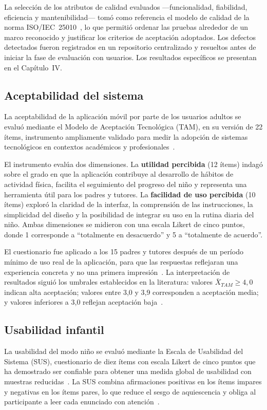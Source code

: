 				La selección de los atributos de calidad evaluados ---funcionalidad, fiabilidad, eficiencia y mantenibilidad--- tomó como referencia el modelo de calidad de la norma ISO/IEC~25010~\cite{GuerreroUlloa2024}, lo que permitió ordenar las pruebas alrededor de un marco reconocido y justificar los criterios de aceptación adoptados. Los defectos detectados fueron registrados en un repositorio centralizado y resueltos antes de iniciar la fase de evaluación con usuarios. Los resultados específicos se presentan en el Capítulo~IV.
		
			\subsection{Aceptabilidad del sistema}
				La aceptabilidad de la aplicación móvil por parte de los usuarios adultos se evaluó mediante el Modelo de Aceptación Tecnológica (TAM), en su versión de 22 ítems, instrumento ampliamente validado para medir la adopción de sistemas tecnológicos en contextos académicos y profesionales~\cite{Venkatesh2003,Davis1989}.
				
				El instrumento evalúa dos dimensiones. La \textbf{utilidad percibida} (12 ítems) indagó sobre el grado en que la aplicación contribuye al desarrollo de hábitos de actividad física, facilita el seguimiento del progreso del niño y representa una herramienta útil para los padres y tutores. La \textbf{facilidad de uso percibida} (10 ítems) exploró la claridad de la interfaz, la comprensión de las instrucciones, la simplicidad del diseño y la posibilidad de integrar su uso en la rutina diaria del niño. Ambas dimensiones se midieron con una escala Likert de cinco puntos, donde 1 corresponde a ``totalmente en desacuerdo'' y 5 a ``totalmente de acuerdo''.
				
				El cuestionario fue aplicado a los 15 padres y tutores después de un período mínimo de uso real de la aplicación, para que las respuestas reflejaran una experiencia concreta y no una primera impresión~\cite{Venkatesh2003}. La interpretación de resultados siguió los umbrales establecidos en la literatura: valores $\bar{X}_{TAM} \geq 4{,}0$ indican alta aceptación; valores entre 3,0 y 3,9 corresponden a aceptación media; y valores inferiores a 3,0 reflejan aceptación baja~\cite{Venkatesh2003,Davis1989}.
		
			\subsection{Usabilidad infantil}
				La usabilidad del modo niño se evaluó mediante la Escala de Usabilidad del Sistema (SUS), cuestionario de diez ítems con escala Likert de cinco puntos que ha demostrado ser confiable para obtener una medida global de usabilidad con muestras reducidas~\cite{Bangor2009,Brooke1996}. La SUS combina afirmaciones positivas en los ítems impares y negativas en los ítems pares, lo que reduce el sesgo de aquiescencia y obliga al participante a leer cada enunciado con atención~\cite{Brooke1996}.
				
